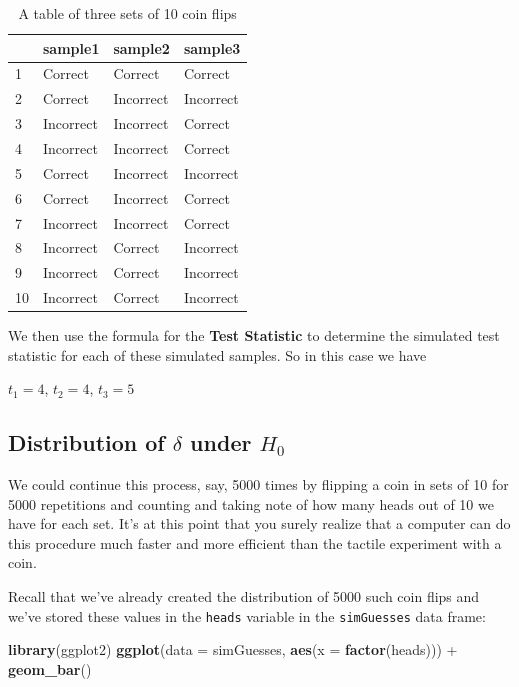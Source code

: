 \documentclass[]{tufte-book}
\newenvironment{Shaded}{\begin{snugshade}}{\end{snugshade}}
\newcommand{\KeywordTok}[1]{\textcolor[rgb]{0.13,0.29,0.53}{\textbf{{#1}}}}
\newcommand{\DataTypeTok}[1]{\textcolor[rgb]{0.13,0.29,0.53}{{#1}}}
\newcommand{\StringTok}[1]{\textcolor[rgb]{0.31,0.60,0.02}{{#1}}}
\newcommand{\NormalTok}[1]{{#1}}
\theoremstyle{definition}
\theoremstyle{definition}
\theoremstyle{remark}
\begin{document}
\begin{table}

\caption{\label{tab:sample-table}A table of three sets of 10 coin flips}
\centering
\begin{tabular}[t]{l|l|l|l}
\hline
  & sample1 & sample2 & sample3\\
\hline
1 & Correct & Correct & Correct\\
\hline
2 & Correct & Incorrect & Incorrect\\
\hline
3 & Incorrect & Incorrect & Correct\\
\hline
4 & Incorrect & Incorrect & Correct\\
\hline
5 & Correct & Incorrect & Incorrect\\
\hline
6 & Correct & Incorrect & Correct\\
\hline
7 & Incorrect & Incorrect & Correct\\
\hline
8 & Incorrect & Correct & Incorrect\\
\hline
9 & Incorrect & Correct & Incorrect\\
\hline
10 & Incorrect & Correct & Incorrect\\
\hline
\end{tabular}
\end{table}

We then use the formula for the \textbf{Test Statistic} to determine the
simulated test statistic for each of these simulated samples. So in this
case we have

\(t_1 = 4\), \(t_2 = 4\), \(t_3 = 5\)

\subsection{\texorpdfstring{Distribution of \(\delta\) under
\(H_0\)}{Distribution of \textbackslash{}delta under H\_0}}\label{distribution-of-delta-under-h_0}

We could continue this process, say, 5000 times by flipping a coin in
sets of 10 for 5000 repetitions and counting and taking note of how many
heads out of 10 we have for each set. It's at this point that you surely
realize that a computer can do this procedure much faster and more
efficient than the tactile experiment with a coin.

Recall that we've already created the distribution of 5000 such coin
flips and we've stored these values in the \texttt{heads} variable in
the \texttt{simGuesses} data frame:

\begin{Shaded}
\begin{Highlighting}[]
\KeywordTok{library}\NormalTok{(ggplot2)}
\KeywordTok{ggplot}\NormalTok{(}\DataTypeTok{data =} \NormalTok{simGuesses, }\KeywordTok{aes}\NormalTok{(}\DataTypeTok{x =} \KeywordTok{factor}\NormalTok{(heads))) +}
\StringTok{  }\KeywordTok{geom_bar}\NormalTok{()}
\end{Highlighting}
\end{Shaded}
\end{document}
